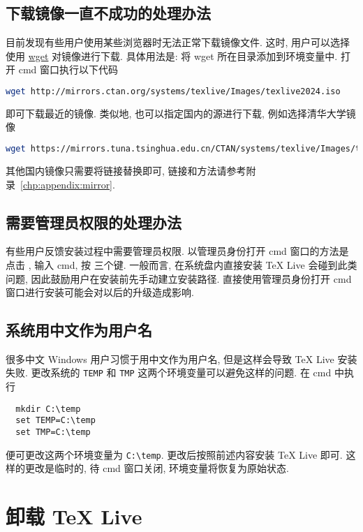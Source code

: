 \subsection{下载镜像一直不成功的处理办法}

目前发现有些用户使用某些浏览器时无法正常下载镜像文件.
这时,
用户可以选择使用 \href{https://eternallybored.org/misc/wget/}{\textsf{wget}} 对镜像进行下载.
具体用法是:
将 \textsf{wget} 所在目录添加到环境变量中.
打开 \textsf{cmd} 窗口执行以下代码
\begin{lstlisting}[language = bash]
  wget http://mirrors.ctan.org/systems/texlive/Images/texlive2024.iso
\end{lstlisting}
即可下载最近的镜像.
类似地,
也可以指定国内的源进行下载,
例如选择清华大学镜像
\begin{lstlisting}[language = bash]
  wget https://mirrors.tuna.tsinghua.edu.cn/CTAN/systems/texlive/Images/texlive2024.iso
\end{lstlisting}
其他国内镜像只需要将链接替换即可,
链接和方法请参考附录~\ref{chp:appendix:mirror}.

\subsection{需要管理员权限的处理办法}

有些用户反馈安装过程中需要管理员权限.
以管理员身份打开 \textsf{cmd} 窗口的方法是点击 \keys{\faWindows},
输入 \textsf{cmd},
按 \keys{\ctrl + \shift + \enter} 三个键.
一般而言,
在系统盘内直接安装 \TeX{} Live 会碰到此类问题,
因此鼓励用户在安装前先手动建立安装路径.
直接使用管理员身份打开 \textsf{cmd} 窗口进行安装可能会对以后的升级造成影响.

\subsection{系统用中文作为用户名}\label{sec:chinesename}

很多中文 Windows 用户习惯于用中文作为用户名,
但是这样会导致 \TeX{} Live 安装失败.
更改系统的 \texttt{TEMP} 和 \texttt{TMP} 这两个环境变量可以避免这样的问题.
在 \textsf{cmd} 中执行
\begin{lstlisting}
  mkdir C:\temp
  set TEMP=C:\temp
  set TMP=C:\temp
\end{lstlisting}
便可更改这两个环境变量为 \texttt{C:\textbackslash temp}.
更改后按照前述内容安装 \TeX{} Live 即可.
这样的更改是临时的,
待 \textsf{cmd} 窗口关闭,
环境变量将恢复为原始状态.

\section{卸载 \TeX{} Live}

